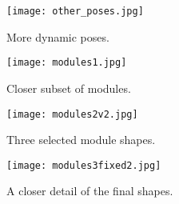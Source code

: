 \begin{figure}
  \texttt{[image: other\_poses.jpg]}
  \caption{More dynamic poses.}
  \label{fig:dynamicposes}
\end{figure}

\begin{figure}
  \texttt{[image: modules1.jpg]}
  \caption{Closer subset of modules.}
  \label{fig:subsetofmods}
\end{figure}

\begin{figure}
  \texttt{[image: modules2v2.jpg]}
  \caption{Three selected module shapes.}
  \label{fig:selectedmods}
\end{figure}

\begin{figure*}
  \texttt{[image: modules3fixed2.jpg]}
  \caption{A closer detail of the final shapes.}
  \label{fig:finalmods}
\end{figure*}
